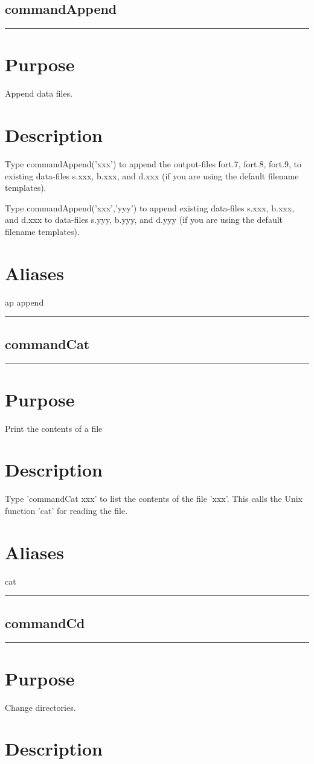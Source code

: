 \documentclass[12pt]{report}
\begin{document}
\subsection{commandAppend} \label{sec:clui_ref_commandAppend}\begin{minipage}{6in}\hrule\medskip\section*{Purpose}
Append data files.\section*{Description}

    Type commandAppend('xxx') to append the output-files fort.7, fort.8,
    fort.9, to existing data-files s.xxx, b.xxx, and d.xxx (if you are
    using the default filename templates).

    Type commandAppend('xxx','yyy') to append existing data-files s.xxx, b.xxx,
    and d.xxx to data-files s.yyy, b.yyy, and d.yyy (if you are using
    the default filename templates).
    \section*{Aliases}
ap append \medskip\hrule\end{minipage}\subsection{commandCat} \label{sec:clui_ref_commandCat}\begin{minipage}{6in}\hrule\medskip\section*{Purpose}
Print the contents of a file\section*{Description}

    Type 'commandCat xxx' to list the contents of the file 'xxx'.  This calls the
    Unix function 'cat' for reading the file.  
    \section*{Aliases}
cat \medskip\hrule\end{minipage}\subsection{commandCd} \label{sec:clui_ref_commandCd}\begin{minipage}{6in}\hrule\medskip\section*{Purpose}
Change directories.\section*{Description}
    

\end{minipage}
\end{document}
